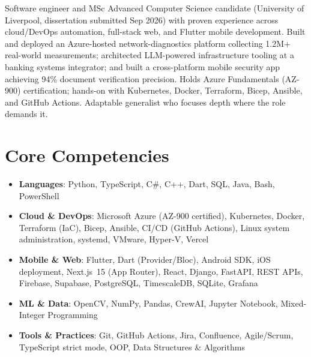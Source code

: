 \documentclass[11pt,a4paper,sans]{moderncv}
\begin{document}
\makecvtitle


\vspace{6pt}
\small{Software engineer and MSc Advanced Computer Science candidate (University of Liverpool, dissertation submitted Sep 2026) with proven experience across cloud/DevOps automation, full-stack web, and Flutter mobile development. Built and deployed an Azure-hosted network-diagnostics platform collecting 1.2M+ real-world measurements; architected LLM-powered infrastructure tooling at a banking systems integrator; and built a cross-platform mobile security app achieving 94\% document verification precision. Holds Azure Fundamentals (AZ-900) certification; hands-on with Kubernetes, Docker, Terraform, Bicep, Ansible, and GitHub Actions. Adaptable generalist who focuses depth where the role demands it.}


\section{Core Competencies}
\vspace{1pt}
\begin{itemize}

\item \textbf{Languages}: Python, TypeScript, C\#, C++, Dart, SQL, Java, Bash, PowerShell

\item \textbf{Cloud \& DevOps}: Microsoft Azure (AZ-900 certified), Kubernetes, Docker, Terraform (IaC), Bicep, Ansible, CI/CD (GitHub Actions), Linux system administration, systemd, VMware, Hyper-V, Vercel

\item \textbf{Mobile \& Web}: Flutter, Dart (Provider/Bloc), Android SDK, iOS deployment, Next.js~15 (App Router), React, Django, FastAPI, REST APIs, Firebase, Supabase, PostgreSQL, TimescaleDB, SQLite, Grafana

\item \textbf{ML \& Data}: OpenCV, NumPy, Pandas, CrewAI, Jupyter Notebook, Mixed-Integer Programming

\item \textbf{Tools \& Practices}: Git, GitHub Actions, Jira, Confluence, Agile/Scrum, TypeScript strict mode, OOP, Data Structures \& Algorithms

\end{itemize}
\end{document}

